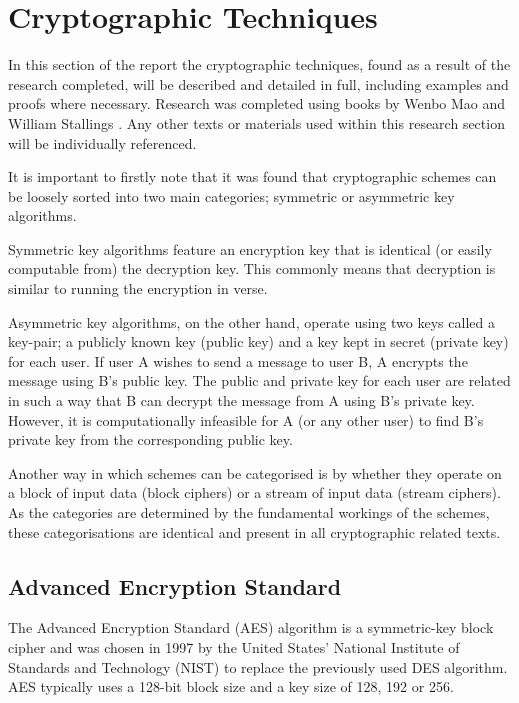 \documentclass[a4paper,12pt]{report}
\begin{document}
\section{Cryptographic Techniques}

In this section of the report the cryptographic techniques, found as a result of the research completed, will be described and detailed in full, including examples and proofs where necessary. Research was completed using books by Wenbo Mao \cite{wenbomao} and William Stallings \cite{willstallings}. Any other texts or materials used within this research section will be individually referenced. 

It is important to firstly note that it was found that cryptographic schemes can be loosely sorted into two main categories; symmetric or asymmetric key algorithms. 

Symmetric key algorithms feature an encryption key that is identical (or easily computable from) the decryption key. This commonly means that decryption is similar to running the encryption in verse.

Asymmetric key algorithms, on the other hand, operate using two keys called a key-pair; a publicly known key (public key) and a key kept in secret (private key) for each user. If user A wishes to send a message to user B, A encrypts the message using B's public key. The public and private key for each user are related in such a way that B can decrypt the message from A using B's private key. However, it is computationally infeasible for A (or any other user) to find B's private key from the corresponding public key.

Another way in which schemes can be categorised is by whether they operate on a block of input data (block ciphers) or a stream of input data (stream ciphers). As the categories are determined by the fundamental workings of the schemes, these categorisations are identical and present in all cryptographic related texts. 

\subsection{Advanced Encryption Standard}

The Advanced Encryption Standard (AES) algorithm is a symmetric-key block cipher and was chosen in 1997 by the United States' National Institute of Standards and Technology (NIST) to replace the previously used DES algorithm. AES typically uses a 128-bit block size and a key size of 128, 192 or 256. 
\end{document}
